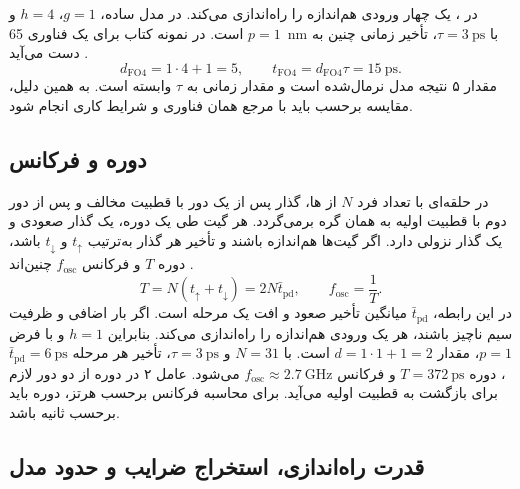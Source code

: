 در ، یک  چهار ورودی
 هم‌اندازه را راه‌اندازی می‌کند. در مدل ساده،
\(g=1\)، \(h=4\) و \(p=1\) است. در نمونه کتاب برای یک فناوری
\qty{65}{\nano\metre} با
\(\tau=\qty{3}{\pico\second}\)، تأخیر زمانی چنین به دست می‌آید
\cite[مثال ، صفحه ۱۵۸]{weste}
\cite[اسلاید ۱۲]{logicaleffortslides}.
\[
  d_{\mathrm{FO4}}=1\cdot4+1=5,\qquad
  t_{\mathrm{FO4}}=d_{\mathrm{FO4}}\tau=\qty{15}{\pico\second}.
\]
مقدار ۵ نتیجه مدل نرمال‌شده است و مقدار زمانی به \(\tau\)
وابسته است. به همین دلیل، مقایسه برحسب  باید با
مرجع همان فناوری و شرایط کاری انجام شود.

\subsection{دوره و فرکانس }
\label{sec:delay-ring-oscillator}

در حلقه‌ای با تعداد فرد \(N\) از ها، گذار پس
از یک دور با قطبیت مخالف و پس از دور دوم با قطبیت اولیه به
همان گره برمی‌گردد. هر گیت طی یک دوره، یک گذار صعودی و یک
گذار نزولی دارد. اگر گیت‌ها هم‌اندازه باشند و تأخیر هر گذار
به‌ترتیب \(t_\uparrow\) و \(t_\downarrow\) باشد، دوره \(T\) و
فرکانس \(f_{\mathrm{osc}}\) چنین‌اند
\cite[شکل  و مثال ، صفحات ۱۵۸ و ۱۵۹]{weste}
\cite[اسلایدهای ۱۰ و ۱۱]{logicaleffortslides}.
\begin{equation}
  T=N(t_\uparrow+t_\downarrow)=2N\bar t_{\mathrm{pd}},\qquad
  f_{\mathrm{osc}}=\frac{1}{T}.
  \label{eq:delay-ring-frequency}
\end{equation}
در این رابطه، \(\bar t_{\mathrm{pd}}\) میانگین تأخیر صعود و افت
یک مرحله است. اگر بار اضافی و ظرفیت سیم ناچیز باشند، هر
 یک ورودی هم‌اندازه را راه‌اندازی می‌کند. بنابراین
\(h=1\) و با فرض \(p=1\)، مقدار \(d=1\cdot1+1=2\) است.
با \(N=31\) و \(\tau=\qty{3}{\pico\second}\)، تأخیر هر
مرحله \(\bar t_{\mathrm{pd}}=\qty{6}{\pico\second}\)، دوره
\(T=\qty{372}{\pico\second}\) و فرکانس
\(f_{\mathrm{osc}}\approx\qty{2.7}{\giga\hertz}\) می‌شود.
عامل ۲ در دوره از دو دور لازم برای بازگشت به قطبیت اولیه می‌آید.
برای محاسبه فرکانس برحسب هرتز، دوره باید برحسب ثانیه باشد.

\subsection{قدرت راه‌اندازی، استخراج ضرایب و حدود مدل}
\label{sec:delay-characterization}

